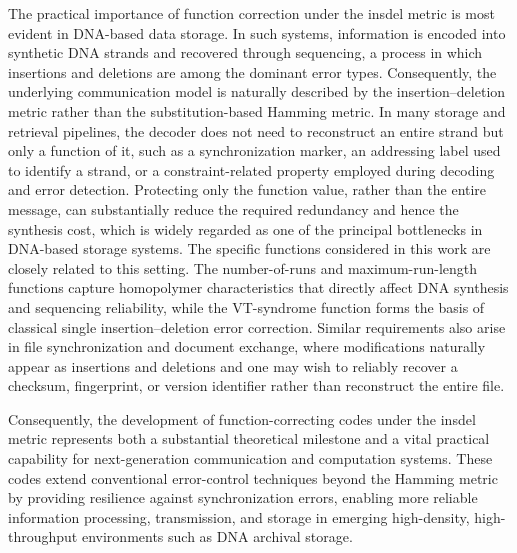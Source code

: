 \documentclass[11 pt]{article}
\numberwithin{equation}{section}
\begin{document}
    The practical importance of function correction under the insdel metric is most evident in DNA-based data storage. In such systems, information is encoded into synthetic DNA strands and recovered through sequencing, a process in which insertions and deletions are among the dominant error types. Consequently, the underlying communication model is naturally described by the insertion--deletion metric rather than the substitution-based Hamming metric. In many storage and retrieval pipelines, the decoder does not need to reconstruct an entire strand but only a function of it, such as a synchronization marker, an addressing label used to identify a strand, or a constraint-related property employed during decoding and error detection. Protecting only the function value, rather than the entire message, can substantially reduce the required redundancy and hence the synthesis cost, which is widely regarded as one of the principal bottlenecks in DNA-based storage systems. The specific functions considered in this work are closely related to this setting. The number-of-runs and maximum-run-length functions capture homopolymer characteristics that directly affect DNA synthesis and sequencing reliability, while the VT-syndrome function forms the basis of classical single insertion--deletion error correction. Similar requirements also arise in file synchronization and document exchange, where modifications naturally appear as insertions and deletions and one may wish to reliably recover a checksum, fingerprint, or version identifier rather than reconstruct the entire file.

    Consequently, the development of function-correcting codes under the insdel metric represents both a substantial theoretical milestone and a vital practical capability for next-generation communication and computation systems. These codes extend conventional error-control techniques beyond the Hamming metric by providing resilience against synchronization errors, enabling more reliable information processing, transmission, and storage in emerging high-density, high-throughput environments such as DNA archival storage.
    
\end{document}
